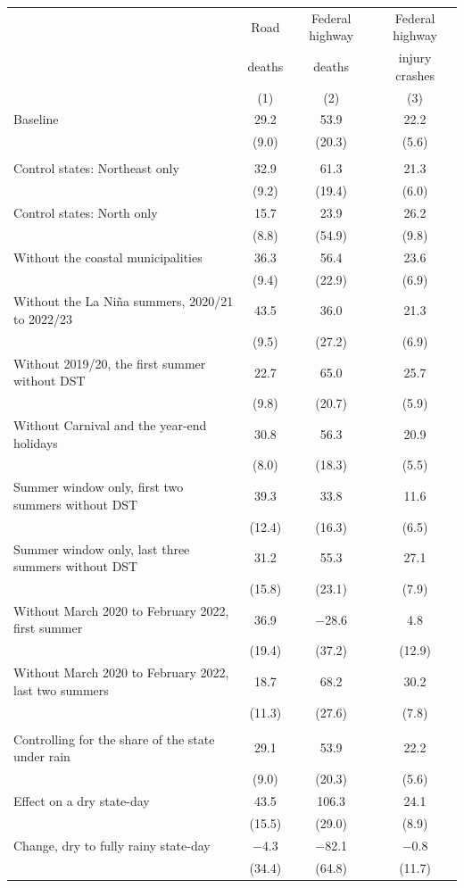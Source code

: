 \begin{tabular}{@{}l ccc@{}}
\toprule
 & Road & Federal highway & Federal highway \\
 & deaths & deaths & injury crashes \\
 & (1) & (2) & (3) \\
\midrule
Baseline & 29.2 & 53.9 & 22.2 \\
 & (9.0) & (20.3) & (5.6) \\
\addlinespace
\multicolumn{4}{@{}l}{\textit{Panel A. Comparison states, places, seasons, and days}} \\
Control states: Northeast only & 32.9 & 61.3 & 21.3 \\
 & (9.2) & (19.4) & (6.0) \\
Control states: North only & 15.7 & 23.9 & 26.2 \\
 & (8.8) & (54.9) & (9.8) \\
Without the coastal municipalities & 36.3 & 56.4 & 23.6 \\
 & (9.4) & (22.9) & (6.9) \\
Without the La Ni\~na summers, 2020/21 to 2022/23 & 43.5 & 36.0 & 21.3 \\
 & (9.5) & (27.2) & (6.9) \\
Without 2019/20, the first summer without DST & 22.7 & 65.0 & 25.7 \\
 & (9.8) & (20.7) & (5.9) \\
Without Carnival and the year-end holidays & 30.8 & 56.3 & 20.9 \\
 & (8.0) & (18.3) & (5.5) \\
Summer window only, first two summers without DST & 39.3 & 33.8 & 11.6 \\
 & (12.4) & (16.3) & (6.5) \\
Summer window only, last three summers without DST & 31.2 & 55.3 & 27.1 \\
 & (15.8) & (23.1) & (7.9) \\
Without March 2020 to February 2022, first summer & 36.9 & $-$28.6 & 4.8 \\
 & (19.4) & (37.2) & (12.9) \\
Without March 2020 to February 2022, last two summers & 18.7 & 68.2 & 30.2 \\
 & (11.3) & (27.6) & (7.8) \\
\addlinespace
\multicolumn{4}{@{}l}{\textit{Panel B. Weather}} \\
Controlling for the share of the state under rain & 29.1 & 53.9 & 22.2 \\
 & (9.0) & (20.3) & (5.6) \\
Effect on a dry state-day & 43.5 & 106.3 & 24.1 \\
 & (15.5) & (29.0) & (8.9) \\
Change, dry to fully rainy state-day & $-$4.3 & $-$82.1 & $-$0.8 \\
 & (34.4) & (64.8) & (11.7) \\
\bottomrule
\end{tabular}
